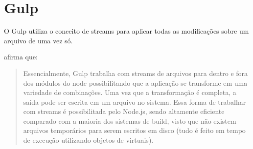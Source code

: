 \section{Gulp}

O Gulp utiliza o conceito de streams para aplicar todas as modificações sobre
um arquivo de uma vez só.

\cite{crossPlatformMobileGame} afirma que:
\begin{quote}
Essencialmente, Gulp trabalha com streams de arquivos para dentro e fora
dos módulos do node possibilitando que a aplicação se transforme
em uma variedade de combinações. Uma vez que a transformação é
completa, a saída pode ser escrita em um arquivo no sistema. Essa forma
de trabalhar com streams é possibilitada pelo Node.js, sendo altamente
eficiente comparado com a maioria dos sistemas de build, visto que não
existem arquivos temporários para serem escritos em disco (tudo é
feito em tempo de execução utilizando objetos de virtuais).
\end{quote}

